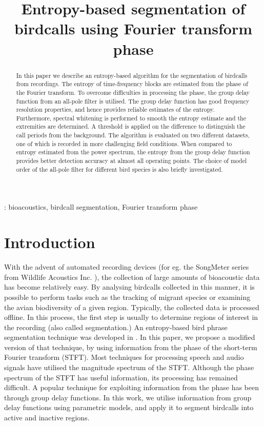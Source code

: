 \documentclass[a4paper]{article}
\title{Entropy-based segmentation of birdcalls using Fourier transform phase}
\begin{document}
  \maketitle
  \begin{abstract}
  In this  paper we describe an entropy-based algorithm for the segmentation of
  birdcalls from recordings. The entropy of time-frequency blocks are estimated
  from the phase of the Fourier transform. To overcome difficulties in
  processing the phase, the group delay function from an all-pole filter is
  utilised. The group delay function has good frequency resolution properties,
  and hence provides reliable estimates of the entropy. Furthermore, spectral
  whitening is performed to smooth the entropy estimate and the extremities are
  determined. A threshold is applied on the difference to distinguish the call
  periods from the background.  The algorithm is evaluated on two different
  datasets, one of which is recorded in more challenging field conditions. When
  compared to entropy estimated from the power spectrum, the entropy from the
  group delay function provides better detection accuracy at almost all
  operating points. The choice of model order of the all-pole filter for
  different bird species is also briefly investigated.
  \end{abstract}
  : bioacoustics, birdcall segmentation, Fourier transform phase
  



\section{Introduction}

With the advent of automated recording devices (for eg. the SongMeter series from Wildlife
Acoustics Inc. \cite{sm3}), the collection of large amounts of
bioacoustic data has become relatively easy. By analysing birdcalls collected in
this manner, it is possible to perform tasks such as the tracking of migrant
species or examining the avian biodiversity of a given region. Typically, the
collected data is processed offline. In this process, the first step is usually to
determine regions of interest in the recording (also called segmentation.) An 
entropy-based bird phrase segmentation
technique was developed in \cite{wang2013}. In this paper, we propose a modified
version of that technique, by using information from the phase of the short-term
Fourier transform (STFT). Most techniques for processing speech and audio signals have
utilised the magnitude spectrum of the STFT. Although the phase spectrum of the STFT has 
useful information, its processing has remained difficult. A popular technique
for exploiting information from the phase has been through group delay functions. In
this work, we utilise information from group delay functions using parametric
models, and apply it to segment birdcalls into active and inactive regions.
\end{document}
